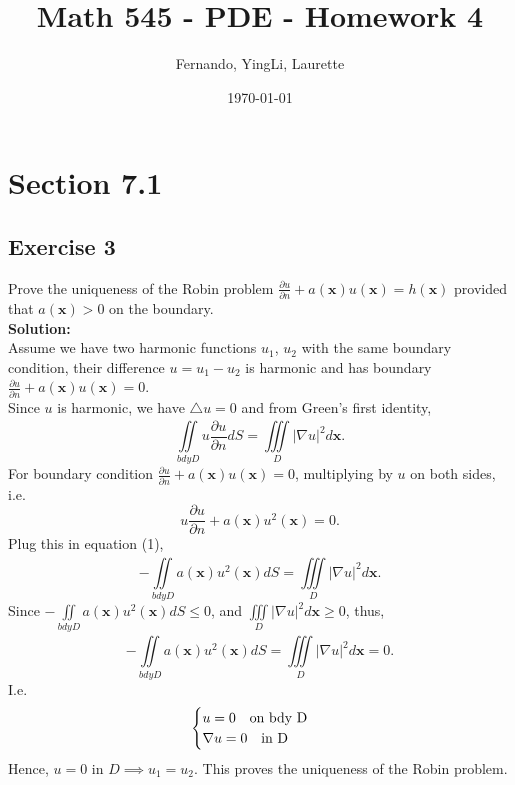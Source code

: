 \documentclass[12pt]{article}%
\begin{document}
\title{Math 545 - PDE - Homework 4}
\author{Fernando, YingLi, Laurette }
\date{\today}
\maketitle

\section*{Section 7.1}
\subsection*{Exercise 3}
Prove the uniqueness of the Robin problem $\frac{\partial u}{\partial n}+a(\mathbf{x})u(\mathbf{x})=h(\mathbf{x})$ provided that 
$a(\mathbf{x})>0$ on the boundary.\\
\textbf{Solution:}\\
Assume we have two harmonic functions $u_{1}$, $u_{2}$ with the same boundary condition, 
their difference $u=u_{1}-u_{2}$ is harmonic and has boundary $\frac{\partial u}{\partial n}+a(\mathbf{x})u(\mathbf{x})=0$.\\
Since $u$ is harmonic, we have $\triangle u=0$ and from Green's first identity,
\begin{equation}
     \iint\limits_{bdy D}^{} u\frac{\partial u}{\partial n}dS=\iiint\limits_{D}^{} \left |\nabla  u \right |^2d\mathbf{x}.  
\end{equation}\label{Green 1}
For boundary condition $\frac{\partial u}{\partial n}+a(\mathbf{x})u(\mathbf{x})=0$, multiplying by $u$ on both sides, i.e.
\[u\frac{\partial u}{\partial n}+a(\mathbf{x})u^2(\mathbf{x})=0.\]
Plug this in equation (1), 
\[ -\iint\limits_{bdy D}^{} a(\mathbf{x})u^2(\mathbf{x}) dS=\iiint\limits_{D}^{} \left |\nabla  u \right |^2d\mathbf{x}.  
\]
Since $-\iint\limits_{bdy D}^{} a(\mathbf{x})u^2(\mathbf{x}) dS \le 0 $, and $\iiint\limits_{D}^{} \left |\nabla  u \right |^2d\mathbf{x}\ge 0$, thus,
\[-\iint\limits_{bdy D}^{} a(\mathbf{x})u^2(\mathbf{x}) dS=\iiint\limits_{D}^{} \left |\nabla  u \right |^2d\mathbf{x} = 0.\]
I.e.
\begin{equation*}
    \begin{cases}
        u=0 \text{\quad on bdy D }\\
        \nabla u=0 \text{\quad  in D }
    \end{cases}
\end{equation*}
Hence, $u=0$ in $D\implies u_{1}=u_{2}$. This proves the uniqueness of the Robin problem.
\end{document}
